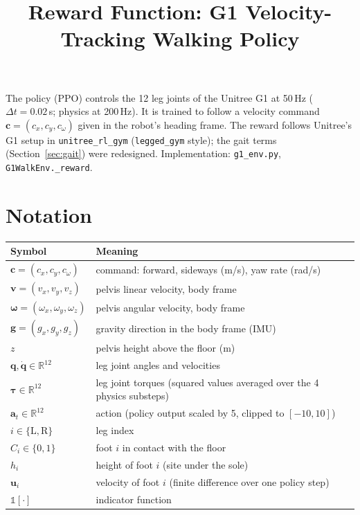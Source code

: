 \documentclass[11pt]{article}
\title{Reward Function: G1 Velocity-Tracking Walking Policy}
\date{}
\newcommand{\ind}{\mathbb{1}}
\begin{document}
\maketitle

The policy (PPO) controls the 12 leg joints of the Unitree G1 at 50\,Hz
($\Delta t = 0.02$\,s; physics at 200\,Hz). It is trained to follow a velocity
command $\mathbf{c} = (c_x, c_y, c_\omega)$ given in the robot's heading frame.
The reward follows Unitree's G1 setup in \texttt{unitree\_rl\_gym}
(\texttt{legged\_gym} style); the gait terms (Section~\ref{sec:gait}) were
redesigned. Implementation: \texttt{g1\_env.py}, \texttt{G1WalkEnv.\_reward}.

\section*{Notation}

\begin{tabular}{@{}ll@{}}
\toprule
Symbol & Meaning \\
\midrule
$\mathbf{c} = (c_x, c_y, c_\omega)$ & command: forward, sideways (m/s), yaw rate (rad/s) \\
$\mathbf{v} = (v_x, v_y, v_z)$ & pelvis linear velocity, body frame \\
$\bm{\omega} = (\omega_x, \omega_y, \omega_z)$ & pelvis angular velocity, body frame \\
$\mathbf{g} = (g_x, g_y, g_z)$ & gravity direction in the body frame (IMU) \\
$z$ & pelvis height above the floor (m) \\
$\mathbf{q}, \dot{\mathbf{q}} \in \mathbb{R}^{12}$ & leg joint angles and velocities \\
$\bm{\tau} \in \mathbb{R}^{12}$ & leg joint torques (squared values averaged over the 4 physics substeps) \\
$\mathbf{a}_t \in \mathbb{R}^{12}$ & action (policy output scaled by 5, clipped to $[-10, 10]$) \\
$i \in \{\mathrm{L}, \mathrm{R}\}$ & leg index \\
$C_i \in \{0,1\}$ & foot $i$ in contact with the floor \\
$h_i$ & height of foot $i$ (site under the sole) \\
$\mathbf{u}_i$ & velocity of foot $i$ (finite difference over one policy step) \\
$\ind[\cdot]$ & indicator function \\
\bottomrule
\end{tabular}
\end{document}
